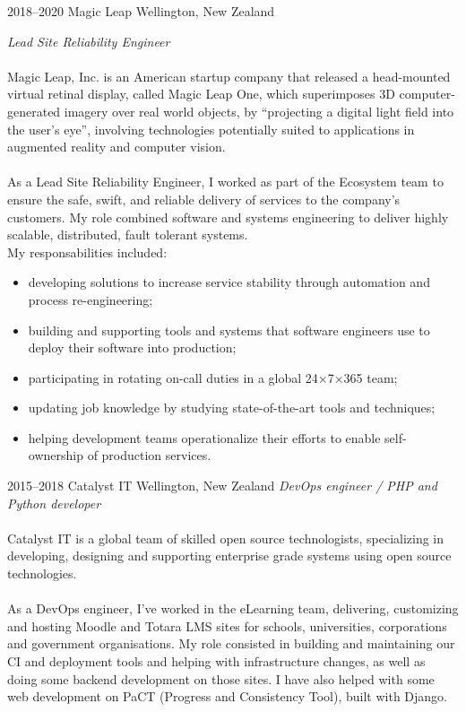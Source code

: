 \documentclass[]{friggeri-cv}
\begin{document}
\begin{entrylist}

  \entry
    {2018--2020}
    {Magic Leap}
    {Wellington, New Zealand}
    {
      \textit{Lead Site Reliability Engineer} \\
      \\
      Magic Leap, Inc. is an American startup company that released a
      head-mounted virtual retinal display, called Magic Leap One, which
      superimposes 3D computer-generated imagery over real world objects, by
      ``projecting a digital light field into the user's eye'', involving
      technologies potentially suited to applications in augmented reality and
      computer vision. \\
      \\
      As a Lead Site Reliability Engineer, I worked as part of the Ecosystem
      team to ensure the safe, swift, and reliable delivery of services to
      the company's customers. My role combined software and systems
      engineering to deliver highly scalable, distributed, fault tolerant
      systems.
      \\
      My responsabilities included:
      \begin{itemize}
        \item developing solutions to increase service stability through
              automation and process re-engineering;
        \item building and supporting tools and systems that software engineers
              use to deploy their software into production;
        \item participating in rotating on-call duties in a global
              24$\times$7$\times$365 team;
        \item updating job knowledge by studying state-of-the-art tools and
              techniques;
        \item helping development teams operationalize their efforts to enable
              self-ownership of production services.
      \end{itemize}
    }

  \entry
    {2015--2018}
    {Catalyst IT}
    {Wellington, New Zealand}
    {
      \textit{DevOps engineer / PHP and Python developer} \\
      \\
      Catalyst IT is a global team of skilled open source technologists,
      specializing in developing, designing and supporting enterprise grade
      systems using open source technologies. \\
      \\
      As a DevOps engineer, I've worked in the eLearning team, delivering,
      customizing and hosting Moodle and Totara LMS sites for schools,
      universities, corporations and government organisations. My role
      consisted in building and maintaining our CI and deployment tools and
      helping with infrastructure changes, as well as doing some backend
      development on those sites. I have also helped with some web development
      on PaCT (Progress and Consistency Tool), built with Django.
    }


\end{entrylist}
\end{document}
